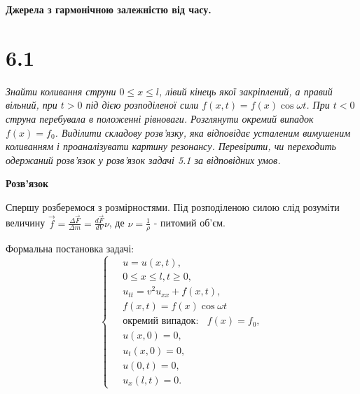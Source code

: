 

%



\textbf{\large Джерела з гармонічною залежністю від часу.}

\section[Задача №6.1]{6.1}

\textit{Знайти коливання струни $0 \leq x \leq l$, лівий кінець якої закріплений, а правий вільний, при $t > 0$ під дією розподіленої сили $f(x,t) = f(x)\cos\omega t$. При $t < 0$ струна перебувала в положенні рівноваги. Розглянути окремий випадок $f(x) = f_0$. Виділити складову розв’язку, яка відповідає усталеним вимушеним коливанням і проаналізувати картину резонансу. Перевірити, чи переходить одержаний розв’язок у розв’язок задачі 5.1 за відповідних умов.}

\begin{center}
    \large{\textbf{Розв'язок}}
\end{center}

\noindent Спершу розберемося з розмірностями. Під розподіленою силою слід розуміти величину $\vec{f}=\frac{\Delta \vec{F}}{\Delta m} = \frac{d\vec{F}}{dV} \nu$, де $\nu =\frac 1\rho$ - питомий об'єм. 

\noindent Формальна постановка задачі:
\begin{equation} \label{cond6,1}
    \left\{ \begin{aligned}
            \;&u = u(x,t), \\
            &0 \leq x \leq l, t \geq 0, \\
            &u_{tt}=v^2u_{xx}+f(x,t), \\
            &f(x,t)=f(x)\cos\omega t\\
            &\text{окремий випадок: }\;\; f(x)= f_0,\\
            &u(x,0)=0,\\
            &u_t(x,0)=0,\\
            &u(0,t) =0, \\
            &u_x(l,t) =0 . 
    \end{aligned} \right.
\end{equation}

